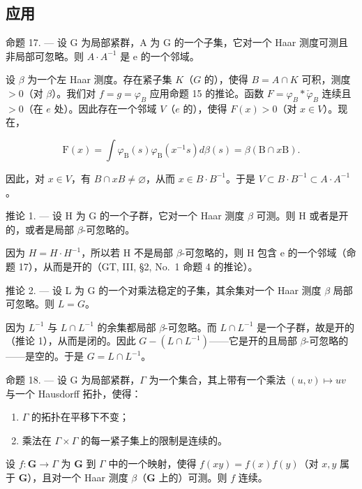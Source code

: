 \subsection{应用}

命题 17. --- 设 G 为局部紧群，A 为 G 的一个子集，它对一个 Haar 测度可测且非局部可忽略。则 \(A \cdot A^{-1}\) 是 e 的一个邻域。

设 \(\beta\) 为一个左 Haar 测度。存在紧子集 \(K\)（\(G\) 的），使得 \(B = A \cap K\) 可积，测度 \(>0\)（对 \(\beta\)）。我们对 \(f = g = \varphi_{B}\) 应用命题 15 的推论。函数 \(F = \varphi_{B} * \check{\varphi}_{B}\) 连续且 \(>0\)（在 \(e\) 处）。因此存在一个邻域 \(V\)（\(e\) 的），使得 \(F(x) > 0\)（对 \(x \in V\)）。现在，

\[
\mathrm{F} (x) = \int \varphi_ {\mathrm{B}} (s) \varphi_ {\mathrm{B}} (x ^ {- 1} s) d \beta (s) = \beta (\mathrm{B} \cap x \mathrm{B}).
\]

因此，对 \(x \in V\)，有 \(B \cap xB \neq \varnothing\)，从而 \(x \in B \cdot B^{-1}\)。于是 \(V \subset B \cdot B^{-1} \subset A \cdot A^{-1}\)。

推论 1. --- 设 H 为 G 的一个子群，它对一个 Haar 测度 \(\beta\) 可测。则 H 或者是开的，或者是局部 \(\beta\)-可忽略的。

因为 \(H = H \cdot H^{-1}\)，所以若 H 不是局部 \(\beta\)-可忽略的，则 H 包含 e 的一个邻域（命题 17），从而是开的（GT, III, §2, No.~1 命题 4 的推论）。

推论 2. --- 设 L 为 G 的一个对乘法稳定的子集，其余集对一个 Haar 测度 \(\beta\) 局部可忽略。则 \(L = G\)。

因为 \(L^{-1}\) 与 \(L \cap L^{-1}\) 的余集都局部 \(\beta\)-可忽略。而 \(L \cap L^{-1}\) 是一个子群，故是开的（推论 1），从而是闭的。因此 \(G - (L \cap L^{-1})\)——它是开的且局部 \(\beta\)-可忽略的——是空的。于是 \(G = L \cap L^{-1}\)。

命题 18. --- 设 G 为局部紧群，\(\Gamma\) 为一个集合，其上带有一个乘法 \((u,v)\mapsto uv\) 与一个 Hausdorff 拓扑，使得：

\begin{enumerate}
\def\labelenumi{\arabic{enumi})}
\item
  \(\Gamma\) 的拓扑在平移下不变；
\item
  乘法在 \(\Gamma \times \Gamma\) 的每一紧子集上的限制是连续的。
\end{enumerate}

设 \(f: \mathbf{G} \to \Gamma\) 为 \(\mathbf{G}\) 到 \(\Gamma\) 中的一个映射，使得 \(f(xy) = f(x)f(y)\)（对 \(x, y\) 属于 \(\mathbf{G}\)），且对一个 Haar 测度 \(\beta\)（\(\mathbf{G}\) 上的）可测。则 \(f\) 连续。

